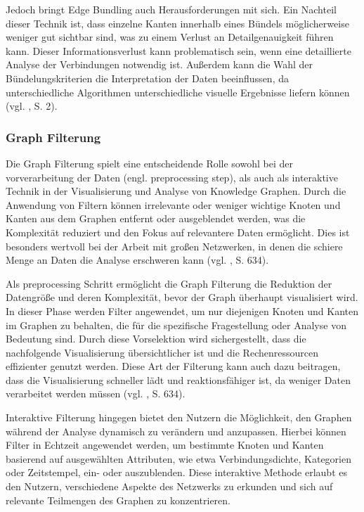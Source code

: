 Jedoch bringt Edge Bundling auch Herausforderungen mit sich. Ein Nachteil dieser Technik ist, dass einzelne Kanten innerhalb eines Bündels möglicherweise weniger gut sichtbar sind, was zu einem Verlust an Detailgenauigkeit führen kann. Dieser Informationsverlust kann problematisch sein, wenn eine detaillierte Analyse der Verbindungen notwendig ist. Außerdem kann die Wahl der Bündelungskriterien die Interpretation der Daten beeinflussen, da unterschiedliche Algorithmen unterschiedliche visuelle Ergebnisse liefern können (vgl. \cite{edgeBundling:Holten}, S. 2).

\subsubsection{Graph Filterung}

Die Graph Filterung spielt eine entscheidende Rolle sowohl bei der vorverarbeitung der Daten (engl. preprocessing step), als auch als interaktive Technik in der Visualisierung und Analyse von Knowledge Graphen. Durch die Anwendung von Filtern können irrelevante oder weniger wichtige Knoten und Kanten aus dem Graphen entfernt oder ausgeblendet werden, was die Komplexität reduziert und den Fokus auf relevantere Daten ermöglicht. Dies ist besonders wertvoll bei der Arbeit mit großen Netzwerken, in denen die schiere Menge an Daten die Analyse erschweren kann (vgl. \cite{chen:SurveyGraphVisualization}, S. 634).

Als preprocessing Schritt ermöglicht die Graph Filterung die Reduktion der Datengröße und deren Komplexität, bevor der Graph überhaupt visualisiert wird. In dieser Phase werden Filter angewendet, um nur diejenigen Knoten und Kanten im Graphen zu behalten, die für die spezifische Fragestellung oder Analyse von Bedeutung sind. Durch diese Vorselektion wird sichergestellt, dass die nachfolgende Visualisierung übersichtlicher ist und die Rechenressourcen effizienter genutzt werden. Diese Art der Filterung kann auch dazu beitragen, dass die Visualisierung schneller lädt und reaktionsfähiger ist, da weniger Daten verarbeitet werden müssen (vgl. \cite{chen:SurveyGraphVisualization}, S. 634).

Interaktive Filterung hingegen bietet den Nutzern die Möglichkeit, den Graphen während der Analyse dynamisch zu verändern und anzupassen. Hierbei können Filter in Echtzeit angewendet werden, um bestimmte Knoten und Kanten basierend auf ausgewählten Attributen, wie etwa Verbindungsdichte, Kategorien oder Zeitstempel, ein- oder auszublenden. Diese interaktive Methode erlaubt es den Nutzern, verschiedene Aspekte des Netzwerks zu erkunden und sich auf relevante Teilmengen des Graphen zu konzentrieren.


